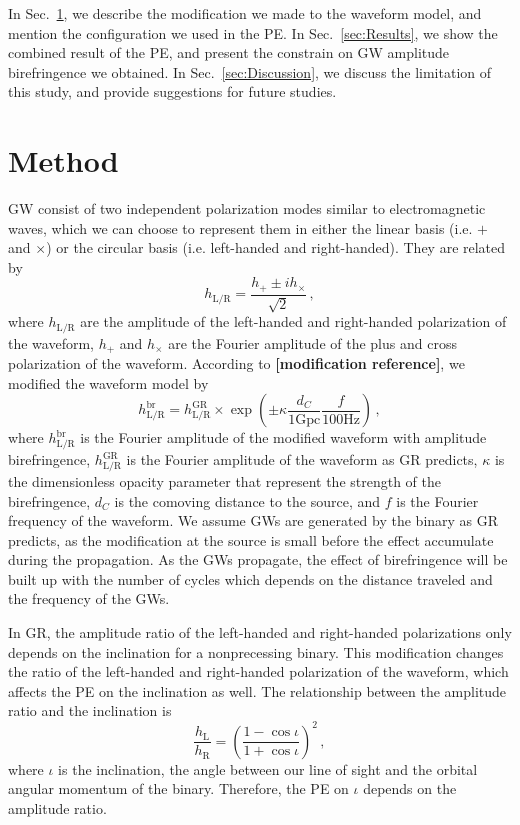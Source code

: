 \documentclass[aps,prd,twocolumn,superscriptaddress,preprintnumbers,floatfix,nofootinbib]{revtex4-2}
\begin{document}
In Sec.~\ref{sec:Method}, we describe the modification we made to the waveform model, and mention the configuration we used in the PE.
In Sec.~\ref{sec:Results}, we show the combined result of the PE, and present the constrain on GW amplitude birefringence we obtained.
In Sec.~\ref{sec:Discussion}, we discuss the limitation of this study, and provide suggestions for future studies.

\section{Method}
\label{sec:Method}
GW consist of two independent polarization modes similar to electromagnetic waves, which we can choose to represent them in either the linear basis (i.e. $+$ and $\times$) or the circular basis (i.e. left-handed and right-handed).
They are related by
\begin{equation}
    h_{\mathrm{L/R}} = \frac{h_+ \pm i h_\times}{\sqrt{2}}\,,
\end{equation}
where $h_{\mathrm{L/R}}$ are the amplitude of the left-handed and right-handed polarization of the waveform, $h_+$ and $h_\times$ are the Fourier amplitude of the plus and cross polarization of the waveform.
According to \textbf{[modification reference]}, we modified the waveform model by
\begin{equation}
    h_\mathrm{L/R}^{\mathrm{br}}=
    h_\mathrm{L/R}^{\mathrm{GR}}\times
    \exp\left(\pm\kappa\frac{d_C}{1\mathrm{Gpc}}\frac{f}{100\mathrm{Hz}}\right)\,,
\end{equation}
where $h_\mathrm{L/R}^{\mathrm{br}}$ is the Fourier amplitude of the modified waveform with amplitude birefringence, $h_\mathrm{L/R}^{\mathrm{GR}}$ is the Fourier amplitude of the waveform as GR predicts, $\kappa$ is the dimensionless opacity parameter that represent the strength of the birefringence, $d_C$ is the comoving distance to the source, and $f$ is the Fourier frequency of the waveform.
We assume GWs are generated by the binary as GR predicts, as the modification at the source is small before the effect accumulate during the propagation.
As the GWs propagate, the effect of birefringence will be built up with the number of cycles which depends on the distance traveled and the frequency of the GWs.

In GR, the amplitude ratio of the left-handed and right-handed polarizations only depends on the inclination for a nonprecessing binary.
This modification changes the ratio of the left-handed and right-handed polarization of the waveform, which affects the PE on the inclination as well.
The relationship between the amplitude ratio and the inclination is
\begin{equation}
    \frac{h_\mathrm{L}}{h_\mathrm{R}}=\left(\frac{1-\cos\iota}{1+\cos\iota}\right)^2\,,
\end{equation}
where $\iota$ is the inclination, the angle between our line of sight and the orbital angular momentum of the binary.
Therefore, the PE on $\iota$ depends on the amplitude ratio.
\end{document}
